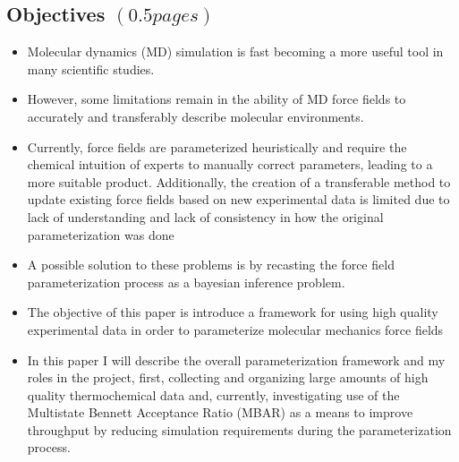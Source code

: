 \documentclass[aps,pre,onecolumn,nofootinbib,superscriptaddress,linenumbers,12pt, draft,tightenlines]{revtex4-1}
\begin{document}
\subsection{Objectives $\left(0.5 pages\right)$}
\begin{itemize}
 \item Molecular dynamics (MD) simulation is fast becoming a more useful tool in many scientific studies.
 \item However, some limitations remain in the ability of MD force fields to accurately and transferably describe molecular environments.
 \item Currently, force fields are parameterized heuristically and require the chemical intuition of experts to manually correct parameters, leading to a more suitable product. Additionally, the creation of a transferable method to update existing force fields based on new experimental data is limited due to lack of understanding and lack of consistency in how the original parameterization was done 
 \item A possible solution to these problems is by recasting the force field parameterization process as a bayesian inference problem.
 \item The objective of this paper is introduce a framework for using high quality experimental data in order to parameterize molecular mechanics force fields
 \item In this paper I will describe the overall parameterization framework and my roles in the project, first, collecting and organizing large amounts of high quality thermochemical data and, currently, investigating use of the Multistate Bennett Acceptance Ratio (MBAR) as a means to improve throughput by reducing simulation requirements during the parameterization process.      
\end{itemize}
\end{document}
